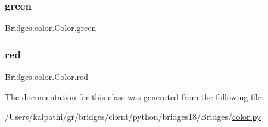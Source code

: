 \subsubsection{\texorpdfstring{green}{green}}
{\footnotesize\ttfamily Bridges.\+color.\+Color.\+green}

\mbox{\label{class_bridges_1_1color_1_1_color_a25663f2be911b45eea32c70a24ef983b}} 
\subsubsection{\texorpdfstring{red}{red}}
{\footnotesize\ttfamily Bridges.\+color.\+Color.\+red}



The documentation for this class was generated from the following file\+:\begin{DoxyCompactItemize}
\item 
/\+Users/kalpathi/gr/bridges/client/python/bridges18/\+Bridges/\mbox{\hyperlink{color_8py}{color.\+py}}\end{DoxyCompactItemize}
